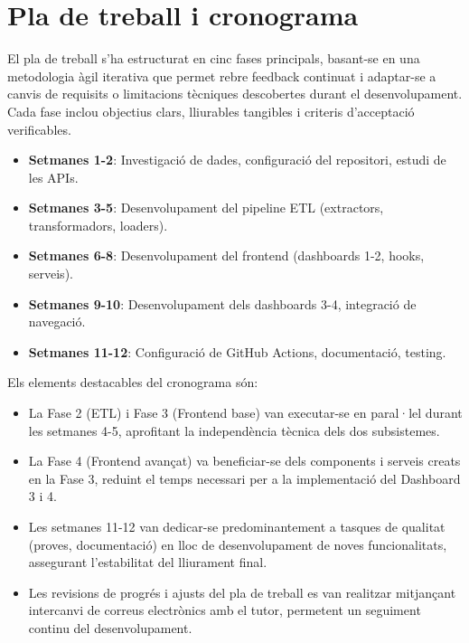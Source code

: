 
\section{Pla de treball i cronograma}

El pla de treball s'ha estructurat en cinc fases principals, basant-se en una metodologia àgil iterativa que permet rebre feedback continuat i adaptar-se a canvis de requisits o limitacions tècniques descobertes durant el desenvolupament. Cada fase inclou objectius clars, lliurables tangibles i criteris d'acceptació verificables.

\begin{itemize}
    \item \textbf{Setmanes 1-2}: Investigació de dades, configuració del repositori, estudi de les APIs.
    \item \textbf{Setmanes 3-5}: Desenvolupament del pipeline ETL (extractors, transformadors, loaders).
    \item \textbf{Setmanes 6-8}: Desenvolupament del frontend (dashboards 1-2, hooks, serveis).
    \item \textbf{Setmanes 9-10}: Desenvolupament dels dashboards 3-4, integració de navegació.
    \item \textbf{Setmanes 11-12}: Configuració de GitHub Actions, documentació, testing.
\end{itemize}

Els elements destacables del cronograma són:
\begin{itemize}
    \item La Fase 2 (ETL) i Fase 3 (Frontend base) van executar-se en paral·lel durant les setmanes 4-5, aprofitant la independència tècnica dels dos subsistemes.
    \item La Fase 4 (Frontend avançat) va beneficiar-se dels components i serveis creats en la Fase 3, reduint el temps necessari per a la implementació del Dashboard 3 i 4.
    \item Les setmanes 11-12 van dedicar-se predominantement a tasques de qualitat (proves, documentació) en lloc de desenvolupament de noves funcionalitats, assegurant l'estabilitat del lliurament final.
    \item Les revisions de progrés i ajusts del pla de treball es van realitzar mitjançant intercanvi de correus electrònics amb el tutor, permetent un seguiment continu del desenvolupament.
\end{itemize}

